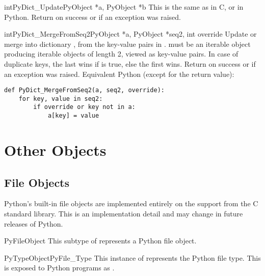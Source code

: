 \begin{cfuncdesc}{int}{PyDict_Update}{PyObject *a, PyObject *b}
  This is the same as  in C,
  or  in Python.  Return  on
  success or  if an exception was raised.
\end{cfuncdesc}

\begin{cfuncdesc}{int}{PyDict_MergeFromSeq2}{PyObject *a, PyObject *seq2,
                                             int override}
  Update or merge into dictionary , from the key-value pairs in
  .   must be an iterable object producing
  iterable objects of length 2, viewed as key-value pairs.  In case of
  duplicate keys, the last wins if  is true, else the
  first wins.
  Return  on success or  if an exception
  was raised.
  Equivalent Python (except for the return value):

\begin{verbatim}
def PyDict_MergeFromSeq2(a, seq2, override):
    for key, value in seq2:
        if override or key not in a:
            a[key] = value
\end{verbatim}

\end{cfuncdesc}


\section{Other Objects \label{otherObjects}}

\subsection{File Objects \label{fileObjects}}

Python's built-in file objects are implemented entirely on the
 support from the C standard library.  This is an
implementation detail and may change in future releases of Python.

\begin{ctypedesc}{PyFileObject}
  This subtype of  represents a Python file object.
\end{ctypedesc}

\begin{cvardesc}{PyTypeObject}{PyFile_Type}
  This instance of  represents the Python file
  type.  This is exposed to Python programs as .
\end{cvardesc}


